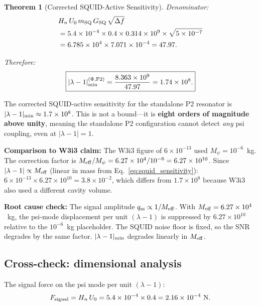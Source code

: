 \documentclass[11pt,twocolumn]{article}
\newcommand{\lam}{\lambda}
\newcommand{\Mpsi}{M_\psi}
\newcommand{\Meff}{M_{\rm eff}}
\newcommand{\ee}[1]{\times 10^{#1}}
\newcommand{\Heff}{H_n}
\newcommand{\Ucav}{U_0}
\newtheorem{theorem}{Theorem}[section]
\theoremstyle{definition}
\theoremstyle{remark}
\begin{document}
\begin{theorem}[Corrected SQUID-Active Sensitivity]
Denominator:
\begin{align}
&\Heff\,\Ucav\,m_{\rm SQ}\,G_{\rm SQ}\,\sqrt{\Delta f}
\nonumber\\
&= 5.4\ee{-4}\times 0.4\times 0.314\times 10^9\times\sqrt{5\ee{-7}}
\nonumber\\
&= 6.785\ee{4}\times 7.071\ee{-4}
= 47.97.
\label{eq:denominator}
\end{align}

Therefore:
\begin{equation}
\boxed{
|\lam-1|_{\rm min}^{(\Phi,\rm P2)}
= \frac{8.363\ee{9}}{47.97}
= 1.74\ee{8}.
}
\label{eq:squid_corrected_result}
\end{equation}
\end{theorem}

\begin{tcolorbox}[colback=red!10!white, colframe=red!70!black,
  title=\textbf{CRITICAL RESULT: Standalone P2 Cannot Detect Psi}]
The corrected SQUID-active sensitivity for the standalone P2 resonator is
$|\lam-1|_{\rm min} \approx 1.7\ee{8}$. This is not a bound---it is
\textbf{eight orders of magnitude above unity}, meaning the standalone P2
configuration cannot detect \emph{any} psi coupling, even at $|\lam-1| = 1$.

\medskip
\textbf{Comparison to W3i3 claim:}
The W3i3 figure of $6\ee{-13}$ used $\Mpsi = 10^{-6}$~kg. The correction
factor is $\Meff/\Mpsi = 6.27\ee{4}/10^{-6} = 6.27\ee{10}$.
Since $|\lam-1| \propto \Meff$ (linear in mass from Eq.~\ref{eq:squid_sensitivity}):
$6\ee{-13}\times 6.27\ee{10} = 3.8\ee{-2}$, which differs from
$1.7\ee{8}$ because W3i3 also used a different cavity volume.

\medskip
\textbf{Root cause check:} The signal amplitude $q_{\rm ss} \propto 1/\Meff$.
With $\Meff = 6.27\ee{4}$~kg, the psi-mode displacement per unit
$(\lam-1)$ is suppressed by $6.27\ee{10}$ relative to the
$10^{-6}$~kg placeholder. The SQUID noise floor is fixed, so the
SNR degrades by the same factor. $|\lam-1|_{\rm min}$ degrades
linearly in $\Meff$.
\end{tcolorbox}

\subsection{Cross-check: dimensional analysis}
\label{sec:dimensional_check}

The signal force on the psi mode per unit $(\lam-1)$:
\begin{equation}
F_{\rm signal} = \Heff\,\Ucav = 5.4\ee{-4}\times 0.4 = 2.16\ee{-4}~\text{N}.
\label{eq:F_signal}
\end{equation}
\end{document}
